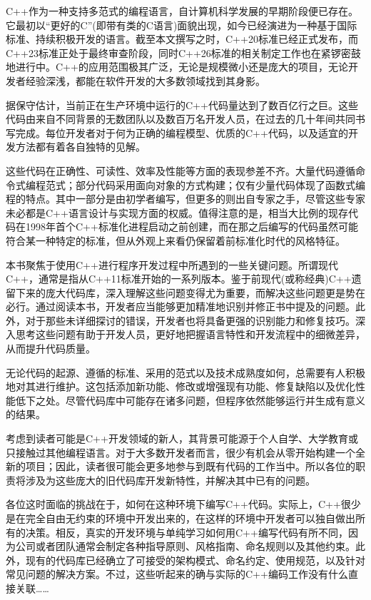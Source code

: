 
C++作为一种支持多范式的编程语言，自计算机科学发展的早期阶段便已存在。它最初以“更好的C”(即带有类的C语言)面貌出现，如今已经演进为一种基于国际标准、持续积极开发的语言。截至本文撰写之时，C++20标准已经正式发布，而C++23标准正处于最终审查阶段，同时C++26标准的相关制定工作也在紧锣密鼓地进行中。C++的应用范围极其广泛，无论是规模微小还是庞大的项目，无论开发者经验深浅，都能在软件开发的大多数领域找到其身影。

据保守估计，当前正在生产环境中运行的C++代码量达到了数百亿行之巨。这些代码由来自不同背景的无数团队以及数百万名开发人员，在过去的几十年间共同书写完成。每位开发者对于何为正确的编程模型、优质的C++代码，以及适宜的开发方法都有着各自独特的见解。

这些代码在正确性、可读性、效率及性能等方面的表现参差不齐。大量代码遵循命令式编程范式；部分代码采用面向对象的方式构建；仅有少量代码体现了函数式编程的特点。其中一部分是由初学者编写，但更多的则出自专家之手，尽管这些专家未必都是C++语言设计与实现方面的权威。值得注意的是，相当大比例的现存代码在1998年首个C++标准化进程启动之前创建，而在那之后编写的代码虽然可能符合某一种特定的标准，但从外观上来看仍保留着前标准化时代的风格特征。

本书聚焦于使用C++进行程序开发过程中所遇到的一些关键问题。所谓现代C++，通常是指从C++11标准开始的一系列版本。鉴于前现代(或称经典)C++遗留下来的庞大代码库，深入理解这些问题变得尤为重要，而解决这些问题更是势在必行。通过阅读本书，开发者应当能够更加精准地识别并修正书中提及的问题。此外，对于那些未详细探讨的错误，开发者也将具备更强的识别能力和修复技巧。深入思考这些问题有助于开发人员，更好地把握语言特性和开发流程中的细微差异，从而提升代码质量。


无论代码的起源、遵循的标准、采用的范式以及技术成熟度如何，总需要有人积极地对其进行维护。这包括添加新功能、修改或增强现有功能、修复缺陷以及优化性能低下之处。尽管代码库中可能存在诸多问题，但程序依然能够运行并生成有意义的结果。

考虑到读者可能是C++开发领域的新人，其背景可能源于个人自学、大学教育或只接触过其他编程语言。对于大多数开发者而言，很少有机会从零开始构建一个全新的项目；因此，读者很可能会更多地参与到既有代码的工作当中。所以各位的职责将涉及为这些庞大的旧代码库开发新特性，并解决其中已有的问题。

各位这时面临的挑战在于，如何在这种环境下编写C++代码。实际上，C++很少是在完全自由无约束的环境中开发出来的，在这样的环境中开发者可以独自做出所有的决策。相反，真实的开发环境与单纯学习如何用C++编写代码有所不同，因为公司或者团队通常会制定各种指导原则、风格指南、命名规则以及其他约束。此外，现有的代码库已经确立了可接受的架构模式、命名约定、使用规范，以及针对常见问题的解决方案。不过，这些听起来的确与实际的C++编码工作没有什么直接关联……

